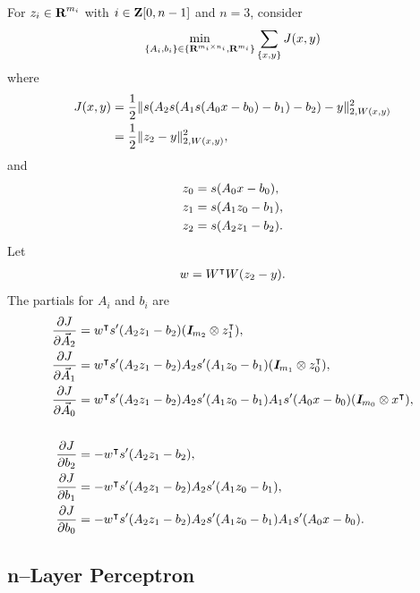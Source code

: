 \documentclass{article}
\begin{document}
    For $z_i\in\textbf{R}^{m_i}$ with $i\in\textbf{Z}[0,n-1]$ and $n=3$, consider
    \begin{align*}
        \min_{\{A_i,b_i\}\in\{\textbf{R}^{m_i\times n_i},\textbf{R}^{m_i}\}}\sum_{\{x,y\}}
        J (x,y)
    \end{align*}
    where
    \begin{align*}
        J(x,y)&=\frac{1}{2}\|s(A_2s(A_1s(A_0x-b_0)-b_1)-b_2)-y \|_{2,W(x,y)}^2\\
        &=\frac{1}{2}\|z_2-y \|_{2,W(x,y)}^2,
    \end{align*}
    and
    \begin{align*}
        z_0&=s(A_0x-b_0),\\
        z_1&=s(A_1z_0-b_1),\\
        z_2&=s(A_2z_1-b_2).
    \end{align*}
    Let
    \begin{align*}
        w=W^\intercal W(z_2-y ).
    \end{align*}
    The partials for $A_i$ and $b_i$ are
    \begin{align*}
        \frac{\partial  J }{\partial \vec{A}_2}&=w^\intercal  s'(A_2z_1 -b_2)(\emph{\textbf{I}}_{m_2}\otimes z_1^\intercal),\\
        \frac{\partial  J }{\partial \vec{A}_1}&=w^\intercal  s'(A_2z_1 -b_2)A_2s'(A_1z_0 -b_1)(\emph{\textbf{I}}_{m_1}\otimes z_0^\intercal),\\
        \frac{\partial  J }{\partial \vec{A}_0}&=w^\intercal  s'(A_2z_1 -b_2)A_2s'(A_1z_0 -b_1)A_1s'(A_0x -b_0)( \emph{\textbf{I}}_{m_0} \otimes x ^\intercal),\\
        \\
        \frac{\partial  J }{\partial b_2}&=-w^\intercal  s'(A_2z_1 -b_2),\\
        \frac{\partial  J }{\partial b_1}&=-w^\intercal  s'(A_2z_1 -b_2)A_2s'(A_1z_0 -b_1),\\
        \frac{\partial  J }{\partial b_0}&=-w^\intercal  s'(A_2z_1 -b_2)A_2s'(A_1z_0 -b_1)A_1s'(A_0x -b_0).
    \end{align*}
    
    \clearpage
\subsection{n--Layer Perceptron}
\end{document}
